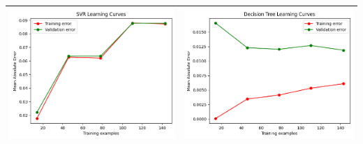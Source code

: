 \begin{table}[H]
    \centering
    \footnotesize
    \setlength\tabcolsep{0pt}
    \begin{tabularx}{\textwidth}{|X|X|}
        \hline
        \includegraphics[width=\linewidth, trim=0 0 0 0]{images/SVR_lc60.png} &
        \includegraphics[width=\linewidth, trim=0 0 0 0]{images/DecisionTree_lc60.png} \\
        \hline

\end{tabularx}
\end{table}
